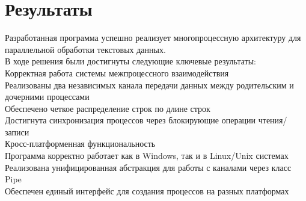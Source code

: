 \section{Результаты}

Разработанная программа успешно реализует многопроцессную архитектуру для параллельной обработки текстовых данных. \\
В ходе решения были достигнуты следующие ключевые результаты:\\
Корректная работа системы межпроцессного взаимодействия\\
Реализованы два независимых канала передачи данных между родительским и дочерними процессами\\
Обеспечено четкое распределение строк по длине строк\\
Достигнута синхронизация процессов через блокирующие операции чтения/записи\\
Кросс-платформенная функциональность\\
Программа корректно работает как в Windows, так и в Linux/Unix системах\\
Реализована унифицированная абстракция для работы с каналами через класс Pipe\\
Обеспечен единый интерфейс для создания процессов на разных платформах\\

